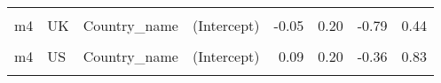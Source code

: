 \begin{table}
\begin{tabular}[t]{llllrrrr}
\cellcolor{gray!10}{m4} & \cellcolor{gray!10}{SE} & \cellcolor{gray!10}{Country\_name} & \cellcolor{gray!10}{EPS} & \cellcolor{gray!10}{0.23} & \cellcolor{gray!10}{0.11} & \cellcolor{gray!10}{-0.02} & \cellcolor{gray!10}{0.44}\\
m4 & UK & Country\_name & (Intercept) & -0.05 & 0.20 & -0.79 & 0.44\\
\cellcolor{gray!10}{m4} & \cellcolor{gray!10}{UK} & \cellcolor{gray!10}{Country\_name} & \cellcolor{gray!10}{EPS} & \cellcolor{gray!10}{-0.12} & \cellcolor{gray!10}{0.10} & \cellcolor{gray!10}{-0.34} & \cellcolor{gray!10}{0.11}\\
m4 & US & Country\_name & (Intercept) & 0.09 & 0.20 & -0.36 & 0.83\\
\cellcolor{gray!10}{m4} & \cellcolor{gray!10}{US} & \cellcolor{gray!10}{Country\_name} & \cellcolor{gray!10}{EPS} & \cellcolor{gray!10}{0.15} & \cellcolor{gray!10}{0.12} & \cellcolor{gray!10}{-0.11} & \cellcolor{gray!10}{0.39}\\
\bottomrule
\end{tabular}
\end{table}
